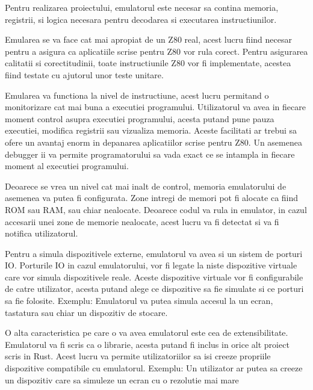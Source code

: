 \documentclass[titlepage,12pt]{article}
\begin{document}
Pentru realizarea proiectului, emulatorul este necesar sa contina memoria, registrii, si logica necesara pentru decodarea si executarea instructiunilor.

Emularea se va face cat mai apropiat de un Z80 real, acest lucru fiind necesar pentru a asigura ca aplicatiile scrise pentru Z80 vor rula corect.
Pentru asigurarea calitatii si corectitudinii, toate instructiunile Z80 vor fi implementate, acestea fiind testate cu ajutorul unor teste unitare.

Emularea va functiona la nivel de instructiune, acest lucru permitand o monitorizare cat mai buna a executiei programului.
Utilizatorul va avea in fiecare moment control asupra executiei programului, acesta putand pune pauza executiei, modifica registrii sau vizualiza memoria.
Aceste facilitati ar trebui sa ofere un avantaj enorm in depanarea aplicatiilor scrise pentru Z80.
Un asemenea debugger ii va permite programatorului sa vada exact ce se intampla in fiecare moment al executiei programului.

Deoarece se vrea un nivel cat mai inalt de control, memoria emulatorului de asemenea va putea fi configurata.
Zone intregi de memori pot fi alocate ca fiind \ac {ROM} sau \ac {RAM}, sau chiar nealocate.
Deoarece codul va rula in emulator, in cazul accesarii unei zone de memorie nealocate, acest lucru va fi detectat si va fi notifica utilizatorul.

Pentru a simula dispozitivele externe, emulatorul va avea si un sistem de porturi \ac {IO}.
Porturile \ac {IO} in cazul emulatorului, vor fi legate la niste dispozitive virtuale care vor simula dispozitivele reale.
Aceste dispozitive virtuale vor fi configurabile de catre utilizator, acesta putand alege ce dispozitive sa fie simulate si ce porturi sa fie folosite.
Exemplu: Emulatorul va putea simula accesul la un ecran, tastatura sau chiar un dispozitiv de stocare.

O alta caracteristica pe care o va avea emulatorul este cea de extensibilitate.
Emulatorul va fi scris ca o librarie, acesta putand fi inclus in orice alt proiect scris in Rust.
Acest lucru va permite utilizatoriilor sa isi creeze propriile dispozitive compatibile cu emulatorul.
Exemplu: Un utilizator ar putea sa creeze un dispozitiv care sa simuleze un ecran cu o rezolutie mai mare



%
\end{document}
